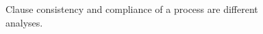 \begin{figure}[H]
\centering
{}
\caption{Clause consistency and compliance of a process are different analyses.}\label{fig:teach-P-02-literature-06}
\end{figure}
